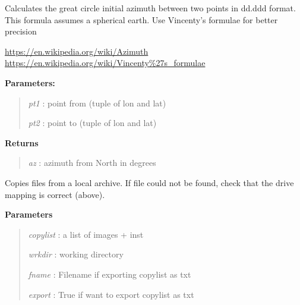 \documentclass[letterpaper,10pt,openany,oneside]{sphinxmanual}
\begin{document}
\begin{fulllineitems}
\label{code:Util.az}
Calculates the great circle initial azimuth between two points
in dd.ddd format. 
This formula assumes a spherical earth.  Use Vincenty's formulae
for better precision

\href{https://en.wikipedia.org/wiki/Azimuth}{https://en.wikipedia.org/wiki/Azimuth}
\href{https://en.wikipedia.org/wiki/Vincenty\%27s\_formulae}{https://en.wikipedia.org/wiki/Vincenty\%27s\_formulae}

\textbf{Parameters:}
\begin{quote}

\emph{pt1} : point from (tuple of lon and lat)

\emph{pt2} : point to (tuple of lon and lat)
\end{quote}

\textbf{Returns}
\begin{quote}

\emph{az}  : azimuth from North in degrees
\end{quote}

\end{fulllineitems}


\begin{fulllineitems}
\label{code:Util.copyfiles}
Copies files from a local archive. If file could not be found, check that the 
drive mapping is correct (above).

\textbf{Parameters}
\begin{quote}

\emph{copylist} : a list of images + inst

\emph{wrkdir}   : working directory

\emph{fname}    : Filename if exporting copylist as txt

\emph{export}   : True if want to export copylist as txt
\end{quote}

\end{fulllineitems}

\end{document}
